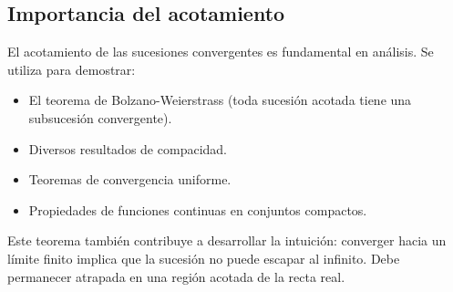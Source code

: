 \subsection{Importancia del acotamiento}

El acotamiento de las sucesiones convergentes es fundamental en
análisis. Se utiliza para demostrar:

\begin{itemize}
  \item El teorema de Bolzano-Weierstrass (toda sucesión acotada tiene
    una subsucesión convergente).
  \item Diversos resultados de compacidad.
  \item Teoremas de convergencia uniforme.
  \item Propiedades de funciones continuas en conjuntos compactos.
\end{itemize}

Este teorema también contribuye a desarrollar la intuición: converger
hacia un límite finito implica que la sucesión no puede escapar al
infinito. Debe permanecer atrapada en una región acotada de la recta
real.

